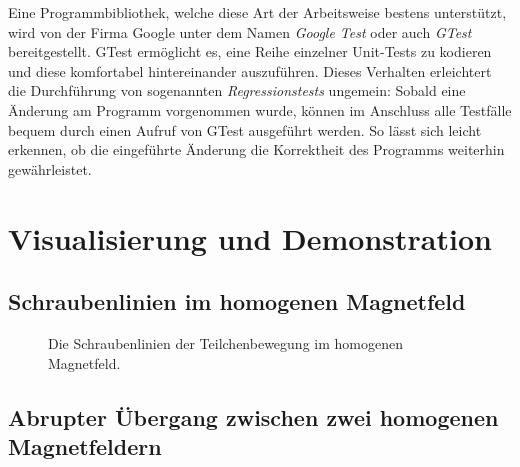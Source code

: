 Eine Programmbibliothek, welche diese Art der Arbeitsweise bestens unterst\"utzt, wird von der Firma Google unter dem Namen
\textit{Google Test}
oder auch \textit{GTest} bereitgestellt. GTest erm\"oglicht es, eine Reihe einzelner Unit-Tests zu kodieren und diese komfortabel
hintereinander auszuf\"uhren. Dieses Verhalten erleichtert die Durchf\"uhrung von sogenannten \textit{Regressionstests} ungemein:
Sobald eine \"Anderung am Programm vorgenommen wurde, k\"onnen im Anschluss alle Testf\"alle bequem durch einen Aufruf von GTest
ausgef\"uhrt werden. So l\"asst sich leicht erkennen, ob die eingef\"uhrte  \"Anderung die Korrektheit des Programms weiterhin
gew\"ahrleistet.

\section{Visualisierung und Demonstration}

\subsection{Schraubenlinien im homogenen Magnetfeld}

\begin{figure}
  \begin{center}
    
  \end{center}
  \caption{Die Schraubenlinien der Teilchenbewegung im homogenen Magnetfeld.}
\end{figure}

\subsection{Abrupter \"Ubergang zwischen zwei homogenen Magnetfeldern}
